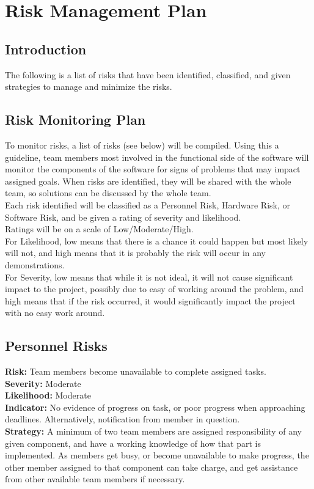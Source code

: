 \documentclass[12pt,a4paper]{article}
\begin{document}
	\section{Risk Management Plan}
    
    \subsection{Introduction}
The following is a list of risks that have been identified, classified, and given strategies to manage and minimize the risks.\\

	\subsection{Risk Monitoring Plan}
To monitor risks, a list of risks (see below) will be compiled. Using this a guideline, team members most involved in the functional side of the software will monitor the components of the software for signs of problems that may impact assigned goals. When risks are identified, they will be shared with the whole team, so solutions can be discussed by the whole team.\\
Each risk identified will be classified as a Personnel Risk, Hardware Risk, or Software Risk, and be given a rating of severity and likelihood.\\
Ratings will be on a scale of Low/Moderate/High.\\
For Likelihood, low means that there is a chance it could happen but most likely will not, and high means that it is probably the risk will occur in any demonstrations.\\
For Severity, low means that while it is not ideal, it will not cause significant impact to the project, possibly due to easy of working around the problem, and high means that if the risk occurred, it would significantly impact the project with no easy work around.
    \subsection{Personnel Risks}
    \textbf{Risk:} Team members become unavailable to complete assigned tasks.\\
    \textbf{Severity:} Moderate \\
    \textbf{Likelihood:} Moderate \\
    \textbf{Indicator:} No evidence of progress on task, or poor progress when approaching deadlines. Alternatively, notification from member in question.\\
    \textbf{Strategy:} A minimum of two team members are assigned responsibility of any given component, and have a working knowledge of how that part is implemented. As members get busy, or become unavailable to make progress, the other member assigned to that component can take charge, and get assistance from other available team members if necessary.\\
    
\end{document}

